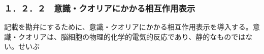 \subsubsection{１．２．２　意識・クオリアにかかる相互作用表示}
記載を勘弁にするために、意識・クオリアにかかる相互作用表示を導入する。意識・クオリアは、脳細胞の物理的化学的電気的反応であり、静的なものではない。せいぶ